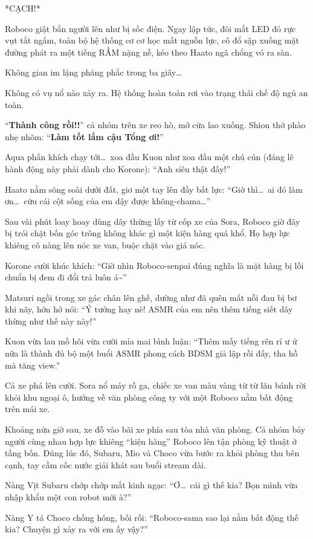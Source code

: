 \documentclass[../main.tex]{subfiles}
\begin{document}
*CẠCH!*

Roboco giật bắn người lên như bị sốc điện. Ngay lập tức, đôi mắt LED đỏ rực vụt tắt ngấm, toàn bộ hệ thống cơ cơ học mất nguồn lực, cô đổ sập xuống mặt đường phát ra một tiếng RẦM nặng nề, kéo theo Haato ngã chổng vó ra sàn.

Không gian im lặng phăng phắc trong ba giây\dots

Không có vụ nổ nào xảy ra. Hệ thống hoàn toàn rơi vào trạng thái chế độ ngủ an toàn.

``\textbf{Thành công rồi!!}'' cả nhóm trên xe reo hò, mở cửa lao xuống. Shion thở phào nhẹ nhõm: ``\textbf{Làm tốt lắm cậu Tổng ơi!}''

Aqua phấn khích chạy tới\dots\ xoa đầu Kuon như xoa đầu một chú cún (đáng lẽ hành động này phải dành cho Korone): ``Anh siêu thật đấy!''

Haato nằm sõng soài dưới đất, giơ một tay lên đầy bất lực: ``Giờ thì\dots\ ai đó làm ơn\dots\ cứu cái cột sống của em dậy được không-chama\dots''

Sau vài phút loay hoay dùng dây thừng lấy từ cốp xe của Sora, Roboco giờ đây bị trói chặt bốn góc trông không khác gì một kiện hàng quá khổ. Họ hợp lực khiêng cô nàng lên nóc xe van, buộc chặt vào giá nóc.

Korone cười khúc khích: ``Giờ nhìn Roboco-senpai đúng nghĩa là mặt hàng bị lỗi chuẩn bị đem đi đổi trả luôn á\~{}''

Matsuri ngồi trong xe gác chân lên ghế, dường như đã quên mất nỗi đau bị bơ khi nãy, hớn hở nói: ``Ý tưởng hay nè! ASMR của em nên thêm tiếng siết dây thừng như thế này này!''

Kuon vừa lau mồ hôi vừa cười mỉa mai bình luận: ``Thêm mấy tiếng rên rỉ ư ử nữa là thành đủ bộ một buổi ASMR phong cách BDSM giả lập rồi đấy, tha hồ mà tăng view.''

Cả xe phá lên cười. Sora nổ máy rồ ga, chiếc xe van màu vàng từ từ lăn bánh rời khỏi khu ngoại ô, hướng về văn phòng công ty với một Roboco nằm bất động trên mái xe.

Khoảng nửa giờ sau, xe đỗ vào bãi xe phía sau tòa nhà văn phòng. Cả nhóm bảy người cùng nhau hợp lực khiêng ``kiện hàng'' Roboco lên tận phòng kỹ thuật ở tầng bốn. Đúng lúc đó, Subaru, Mio và Choco vừa bước ra khỏi phòng thu bên cạnh, tay cầm cốc nước giải khát sau buổi stream dài.

Nàng Vịt Subaru chớp chớp mắt kinh ngạc: ``Ơ\dots\ cái gì thế kia? Bọn mình vừa nhập khẩu một con robot mới à?''

Nàng Y tá Choco chống hông, bối rối: ``Roboco-sama sao lại nằm bất động thế kia? Chuyện gì xảy ra với em ấy vậy?''
\end{document}
